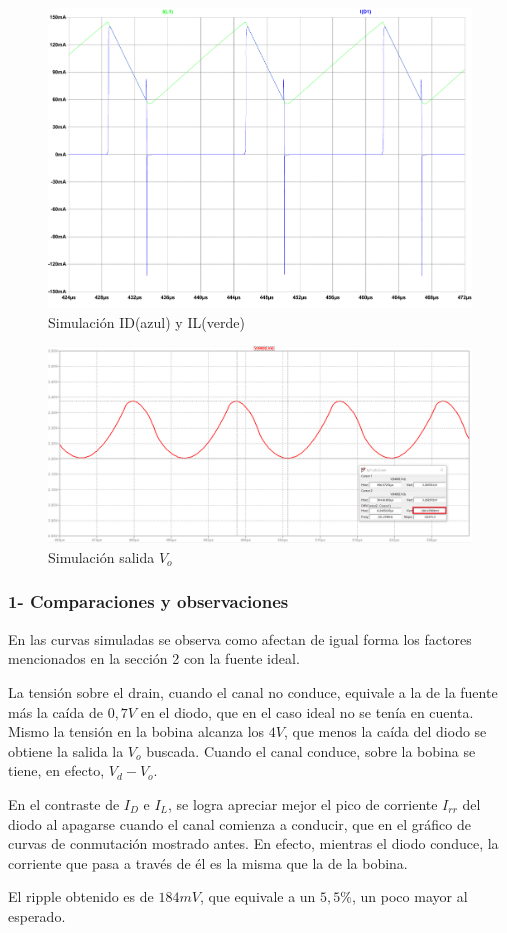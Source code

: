 \documentclass[e4_tp1_main.tex]{subfiles}
\begin{document}
\begin{figure}[H]
\centering
\includegraphics[width=0.7\linewidth]{Imagenes/Punto3/ID-IL.pdf}
\caption{Simulación ID(azul) y IL(verde)}
\end{figure}

\begin{figure}[H]
\centering
\includegraphics[width=0.9\linewidth]{Imagenes/Punto3/Vo.png}
\caption{Simulación salida $V_o$}
\end{figure}

\subsubsection*{1- Comparaciones y observaciones}

En las curvas simuladas se observa como afectan de igual forma los factores mencionados en la sección 2 con la fuente ideal.\par
La tensión sobre el drain, cuando el canal no conduce, equivale a la de la fuente más la caída de $0,7V$ en el diodo, que en el caso ideal no se tenía en cuenta. Mismo la tensión en la bobina alcanza los $4V$, que menos la caída del diodo se obtiene la salida la $V_o$ buscada. Cuando el canal conduce, sobre la bobina se tiene, en efecto, $V_d-V_o$.
\par
En el contraste de $I_D$ e $I_L$, se logra apreciar mejor el pico de corriente $I_{rr}$ del diodo al apagarse cuando el canal comienza a conducir, que en el gráfico de curvas de conmutación mostrado antes. En efecto, mientras el diodo conduce, la corriente que pasa a través de él es la misma que la de la bobina.
\par
El ripple obtenido es de $184mV$, que equivale a un $5,5\%$, un poco mayor al esperado.

\newpage
\end{document}
